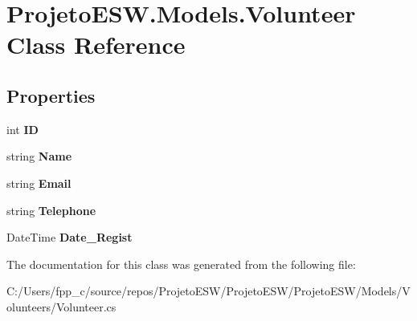 \hypertarget{class_projeto_e_s_w_1_1_models_1_1_volunteer}{}\section{Projeto\+E\+S\+W.\+Models.\+Volunteer Class Reference}
\label{class_projeto_e_s_w_1_1_models_1_1_volunteer}
\subsection*{Properties}
\begin{DoxyCompactItemize}
\item 
\mbox{\label{class_projeto_e_s_w_1_1_models_1_1_volunteer_a1ee2edf3eebd2b9be2a151e92c33954b}} 
int {\bfseries ID}
\item 
\mbox{\label{class_projeto_e_s_w_1_1_models_1_1_volunteer_aa6ac89007a365bdfb9d96d6304529fb9}} 
string {\bfseries Name}
\item 
\mbox{\label{class_projeto_e_s_w_1_1_models_1_1_volunteer_a37e7ba6353980e0625bfa8270010e639}} 
string {\bfseries Email}
\item 
\mbox{\label{class_projeto_e_s_w_1_1_models_1_1_volunteer_a9f04f5231292172182a8fea0f73dd226}} 
string {\bfseries Telephone}
\item 
\mbox{\label{class_projeto_e_s_w_1_1_models_1_1_volunteer_afe56d49190494883fefb7cf1cafce2ca}} 
Date\+Time {\bfseries Date\+\_\+\+Regist}
\end{DoxyCompactItemize}


The documentation for this class was generated from the following file\+:\begin{DoxyCompactItemize}
\item 
C\+:/\+Users/fpp\+\_\+c/source/repos/\+Projeto\+E\+S\+W/\+Projeto\+E\+S\+W/\+Projeto\+E\+S\+W/\+Models/\+Volunteers/Volunteer.\+cs\end{DoxyCompactItemize}
